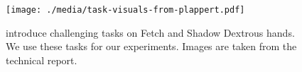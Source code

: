 

%
\begin{figure}%
  \texttt{[image: ./media/task-visuals-from-plappert.pdf]}%
  \label{fig:envs}%
  \caption{\citet{plappert201802multigoalrl} introduce challenging tasks on
Fetch and Shadow Dextrous hands. We use these tasks for our experiments.
    Images are taken from the technical report.}%
\end{figure}%
% 
